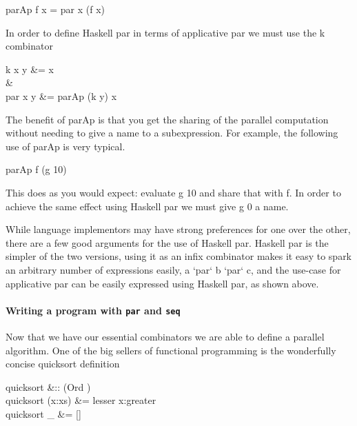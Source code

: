 \begin{haskell}
parAp f x = par x (f x)
\end{haskell}

In order to define Haskell par in terms of applicative par we must use the
\<k\> combinator

\begin{haskell}
k x y &= x \\
\quad&\quad \\
par x y &= parAp (k y) x
\end{haskell}

The benefit of \<parAp\> is that you get the sharing of the parallel computation
without needing to give a name to a subexpression. For example, the following use of
\<parAp\> is very typical.

\begin{haskell}
parAp f (g 10)
\end{haskell}

This does as you would expect: evaluate \<g 10\> and share that with
\<f\>. In order to achieve the same effect using Haskell \<par\> we must
give \<g 0\> a name.

\begin{haskell}
\end{haskell}


While language implementors may have strong preferences for one over the other,
there are a few good arguments for the use of Haskell \<par\>. Haskell
\<par\> is the simpler of the two versions, using it as an infix combinator
makes it easy to spark an arbitrary number of expressions easily,
\<a `par` b `par` c\>, and the use-case for applicative \<par\> can be easily
expressed using Haskell \<par\>, as shown above.

\paragraph{Writing a program with \texttt{par} and \texttt{seq}}

Now that we have our essential combinators we are able to define a parallel
algorithm. One of the big sellers of functional programming is the wonderfully
concise \<quicksort\> definition

\pagebreak

\begin{haskell}
quicksort &:: (Ord \hasalpha) \Rightarrow [\hasalpha] \to [\hasalpha]\\
quicksort (x:xs) &= lesser \hsapp x:greater
             \\
quicksort \_ &= []
\end{haskell}


